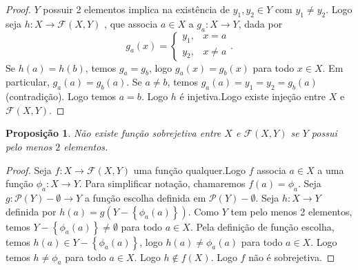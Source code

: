 \documentclass{article}
\newtheorem{prop}{Proposição}[section]
\theoremstyle{theorem}
\theoremstyle{lemma}
\theoremstyle{definition}
\theoremstyle{remark}
\begin{document}
\begin{proof}
	$Y$ possuir 2 elementos implica na existência de $y_1,y_2\in Y$ com $y_1\neq y_2$. Logo seja $h:X\to \mathcal{F}(X,Y)$ , que associa $a\in X$ a $g_a:X\to Y$, dada por $$g_a(x) = \begin{cases} y_1 , & x = a\\ y_2, & x\neq a\end{cases}. $$
		Se $h(a) = h(b)$, temos $g_a = g_b$, logo $g_a(x) = g_b(x)$ para todo $x\in X$. Em particular, $g_a(a) = g_b(a)$. Se $a\neq b$, temos $g_a(a) = y_1 = y_2 = g_b(a)$ (contradição).  Logo temos $ a= b$.  Logo $h$ é injetiva.Logo existe injeção entre $X$ e $\mathcal{F}(X,Y)$.
\end{proof}
\begin{prop}
	Não existe função sobrejetiva entre $X$ e $\mathcal{F}(X,Y)$ se $Y$ possui pelo menos $2$ elementos.
\end{prop}
\begin{proof}
	Seja $f: X \to \mathcal{F}(X,Y)$ uma função qualquer.Logo  $f$ associa $a\in X$ a uma função $\phi_a : X\to Y$. Para simplificar notação, chamaremos $f(a) = \phi_a$. Seja $g: \mathcal{P}(Y) - \emptyset \to Y$ a função escolha definida em $\mathcal{P}(Y) - \emptyset$. Seja $h: X\to Y$ definida por $h(a) = g(Y -  \left\{ \phi_a(a)\right\})$. Como $Y$ tem pelo menos 2 elementos, temos $Y - \left\{ \phi_a(a)\right\} \neq \emptyset$ para todo $a\in X$.  Pela definição de função escolha, temos $h(a) \in Y - \left\{ \phi_a(a)\right\}$, logo $h(a) \neq \phi_a(a)$ para todo $a\in X$. Logo temos $h\neq \phi_a$ para todo $a\in X$. Logo $h\not\in f(X)$. Logo $f$ não é sobrejetiva.
\end{proof}
\end{document}
